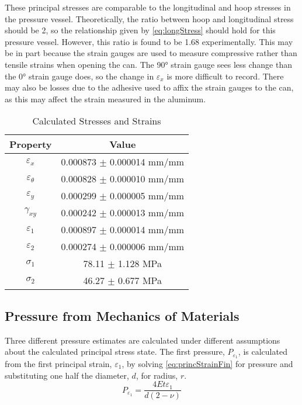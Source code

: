 \documentclass[10pt,journal,letterpaper]{IEEEtran}
\begin{document}
These principal stresses are comparable to the longitudinal and hoop stresses in the pressure vessel.
Theoretically, the ratio between hoop and longitudinal stress should be 2, so the relationship given by \eqref{eq:longStress} should hold for this pressure vessel.
However, this ratio is found to be 1.68 experimentally.
This may be in part because the strain gauges are used to measure compressive rather than tensile strains when opening the can.
The \ang{90} strain gauge sees less change than the \ang{0} strain gauge does, so the change in $\varepsilon_x$ is more difficult to record.
There may also be losses due to the adhesive used to affix the strain gauges to the can, as this may affect the strain measured in the aluminum.

\begin{table}[H]
\renewcommand\arraystretch{1.25}
\centering
\caption{Calculated Stresses and Strains}
\begin{tabular}{cc}
\hline \hline
Property & Value \\
\hline
$\varepsilon_x$ & 0.000873 $\pm$ 0.000014 mm/mm \\
$\varepsilon_\theta$ & 0.000828 $\pm$ 0.000010 mm/mm \\
$\varepsilon_y$ & 0.000299 $\pm$ 0.000005 mm/mm \\
$\gamma_{xy}$ & 0.000242 $\pm$ 0.000013 mm/mm \\
$\varepsilon_1$ & 0.000897 $\pm$ 0.000014 mm/mm \\
$\varepsilon_2$ & 0.000274 $\pm$ 0.000006 mm/mm \\
$\sigma_1$ & 78.11 $\pm$ 1.128 MPa \\
$\sigma_2$ & 46.27 $\pm$ 0.677 MPa \\
\hline \hline
\end{tabular}
\label{tab:CalcedStr}
\end{table}

\subsection{Pressure from Mechanics of Materials}

Three different pressure estimates are calculated under different assumptions about the calculated principal stress state.
The first pressure, $P_{\varepsilon_1}$, is calculated from the first principal strain, $\varepsilon_1$, by solving \eqref{eq:princStrainFin} for pressure and substituting one half the diameter, $d$, for radius, $r$.
\begin{equation}
\label{eq:Peps1}
P_{\varepsilon_1} = \frac{4Et\varepsilon_1}{d(2-\nu)}
\end{equation}
\end{document}
